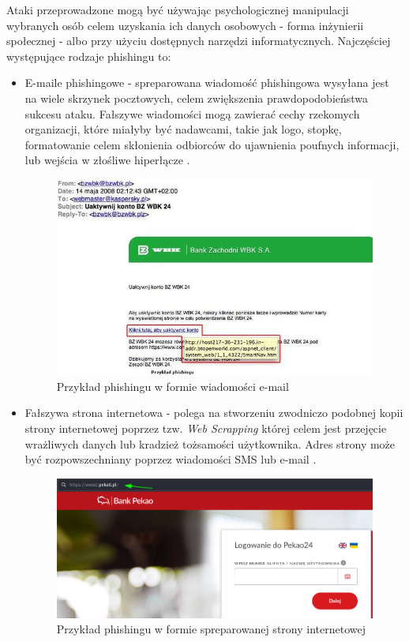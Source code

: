 \documentclass[12pt,twoside]{article}
\begin{document}
Ataki przeprowadzone mogą być używając psychologicznej manipulacji wybranych osób celem uzyskania ich danych osobowych - forma inżynierii społecznej - albo przy użyciu dostępnych narzędzi informatycznych. Najczęściej występujące rodzaje phishingu to:

\begin{itemize}
	\item E-maile phishingowe - spreparowana wiadomość phishingowa wysyłana jest na wiele skrzynek pocztowych, celem zwiększenia prawdopodobieństwa sukcesu ataku. Fałszywe wiadomości mogą zawierać cechy rzekomych organizacji, które miałyby być nadawcami, takie jak logo, stopkę, formatowanie celem skłonienia odbiorców do ujawnienia poufnych informacji, lub wejścia w złośliwe hiperłącze \cite{PhishingEmails}. 
	
	\begin{figure}[H]
		\centering
		\includegraphics[width=1\linewidth]{figures/phishing-example}
		\caption{Przykład phishingu w formie wiadomości e-mail \cite{PhishingExample}}
		\label{fig:phishing-example}
		
	\end{figure}
	
	\item Fałszywa strona internetowa - polega na stworzeniu zwodniczo podobnej kopii strony internetowej poprzez tzw. \emph{Web Scrapping} \cite{WebScrapping} której celem jest przejęcie wrażliwych danych lub kradzież tożsamości użytkownika. Adres strony może być rozpowszechniany poprzez wiadomości SMS lub e-mail \cite{WhatIsPhishing}. 
	
	
	\begin{figure}[H]
		\centering
		\includegraphics[width=0.96\linewidth]{figures/phishing-example2}
		\caption{Przykład phishingu w formie spreparowanej strony internetowej}
		\label{fig:phishing-example2}
	\end{figure}
	

\end{itemize}
\end{document}
